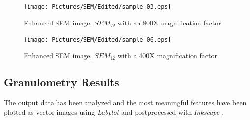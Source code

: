 \documentclass{article}
\begin{document}
          \begin{figure}[h!]
              \centering 
              \texttt{[image: Pictures/SEM/Edited/sample\_03.eps]}
              \caption{Enhanced SEM image, $SEM_{09}$ with an 800X magnification factor}
              \label{fig:SEM_09}
          \end{figure}

%

          \begin{figure}[h!]
              \centering 
              \texttt{[image: Pictures/SEM/Edited/sample\_06.eps]}
              \caption{Enhanced SEM image, $SEM_{12}$ with a 400X magnification factor}
              \label{fig:SEM_12}
          \end{figure}

    \clearpage

    \subsection{Granulometry Results\label{Granulometry_results}}
      
      The output data has been analyzed and the most meaningful features have been plotted as vector images using \textit{Labplot} \autocites{Labplot} and 
      postprocessed with \textit{Inkscape} \autocites{Inkscape}. \\ 
  
\end{document}
